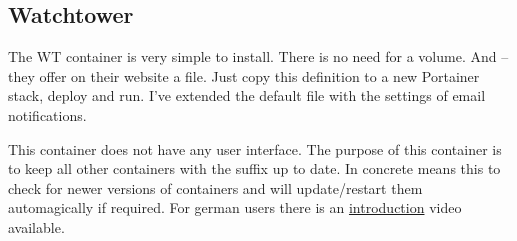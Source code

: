 

\subsection{Watchtower}

The \gls{WT} container is very
simple to install. There is no need for a volume. And -- they offer on their
website a  file. Just copy this definition
to a new Portainer stack, deploy and run. I've extended the default file with
the settings of email notifications. 

This container does not have any user interface. The purpose of this container
is to keep all other containers with the  suffix up
to date. In concrete means this to check for newer versions of containers and
will update/restart them automagically if required. For german users there is
an \href{https://www.youtube.com/watch?v=TFS-s5Aq028}{introduction} video
available.
